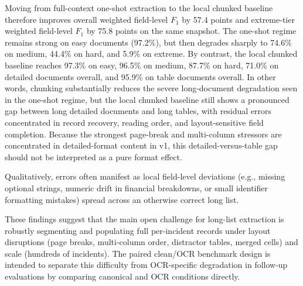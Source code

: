 Moving from full-context one-shot extraction to the local chunked baseline therefore improves overall weighted field-level $F_1$ by 57.4 points and extreme-tier weighted field-level $F_1$ by 75.8 points on the same snapshot. The one-shot regime remains strong on easy documents (97.2\%), but then degrades sharply to 74.6\% on medium, 44.4\% on hard, and 5.9\% on extreme. By contrast, the local chunked baseline reaches 97.3\% on easy, 96.5\% on medium, 87.7\% on hard, 71.0\% on detailed documents overall, and 95.9\% on table documents overall. In other words, chunking substantially reduces the severe long-document degradation seen in the one-shot regime, but the local chunked baseline still shows a pronounced gap between long detailed documents and long tables, with residual errors concentrated in record recovery, reading order, and layout-sensitive field completion. Because the strongest page-break and multi-column stressors are concentrated in detailed-format content in v1, this detailed-versus-table gap should not be interpreted as a pure format effect.

Qualitatively, errors often manifest as local field-level deviations (e.g., missing optional strings, numeric drift in financial breakdowns, or small identifier formatting mistakes) spread across an otherwise correct long list.

These findings suggest that the main open challenge for long-list extraction is robustly segmenting and populating full per-incident records under layout disruptions (page breaks, multi-column order, distractor tables, merged cells) and scale (hundreds of incidents). The paired clean/OCR benchmark design is intended to separate this difficulty from OCR-specific degradation in follow-up evaluations by comparing canonical and OCR conditions directly.

